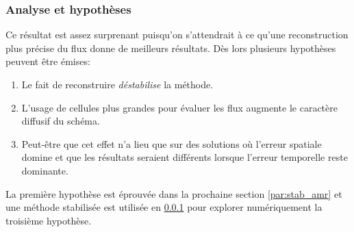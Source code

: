 \subsubsection{Analyse et hypothèses}
Ce résultat est assez surprenant puisqu'on s'attendrait à ce qu'une reconstruction plus précise du flux donne de meilleurs résultats.
Dès lors plusieurs hypothèses peuvent être émises:
\begin{enumerate}
    \item Le fait de reconstruire \textit{déstabilise} la méthode.
    \item L'usage de cellules plus grandes pour évaluer les flux augmente le caractère diffusif du schéma.
    \item Peut-être que cet effet n'a lieu que sur des solutions où l'erreur spatiale domine et que les résultats seraient différents lorsque l'erreur temporelle reste dominante.
\end{enumerate}
La première hypothèse est éprouvée dans la prochaine section \ref{par:stab_amr} et une méthode stabilisée est utilisée en \ref{} pour explorer numériquement la troisième hypothèse.